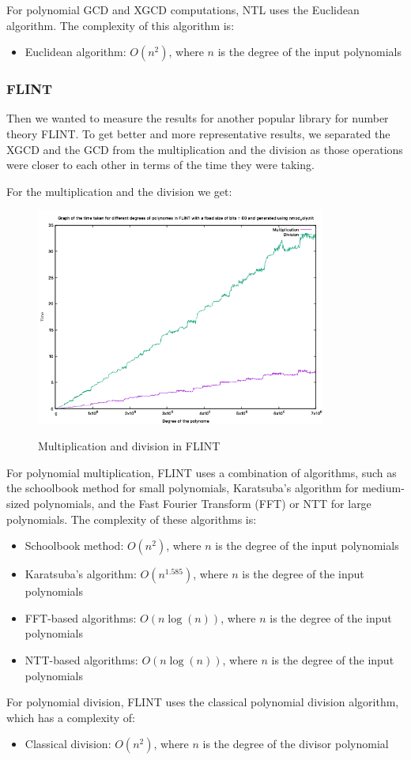 For polynomial GCD and XGCD computations, NTL uses the Euclidean algorithm. The complexity of this algorithm is:
\begin{itemize}
    \item Euclidean algorithm: $O(n^2)$, where $n$ is the degree of the input polynomials
\end{itemize}
\subsubsection{FLINT}

Then we wanted to measure the results for another popular library for number theory FLINT. 
To get better and more representative results, we separated the XGCD and the GCD from the multiplication and the division as those operations were closer to each other in terms of the time they were taking.

For the multiplication and the division we get:
\begin{figure}[H]
    \centering
    \includegraphics[width=0.85\textwidth]{figures/flint_mult_div.png}
    \label{fig2}
    \caption{Multiplication and division in FLINT}
\end{figure}
For polynomial multiplication, FLINT uses a combination of algorithms, such as the schoolbook method for small polynomials, Karatsuba's algorithm for medium-sized polynomials, and the Fast Fourier Transform (FFT) or NTT for large polynomials. The complexity of these algorithms is:
\begin{itemize}
    \item Schoolbook method: $O(n^2)$, where $n$ is the degree of the input polynomials
    \item Karatsuba's algorithm: $O(n^{1.585})$, where $n$ is the degree of the input polynomials
    \item FFT-based algorithms: $O(n \log(n))$, where $n$ is the degree of the input polynomials
    \item NTT-based algorithms: $O(n \log(n))$, where $n$ is the degree of the input polynomials
\end{itemize}
For polynomial division, FLINT uses the classical polynomial division algorithm, which has a complexity of:
\begin{itemize}
    \item Classical division: $O(n^2)$, where $n$ is the degree of the divisor polynomial
\end{itemize}

